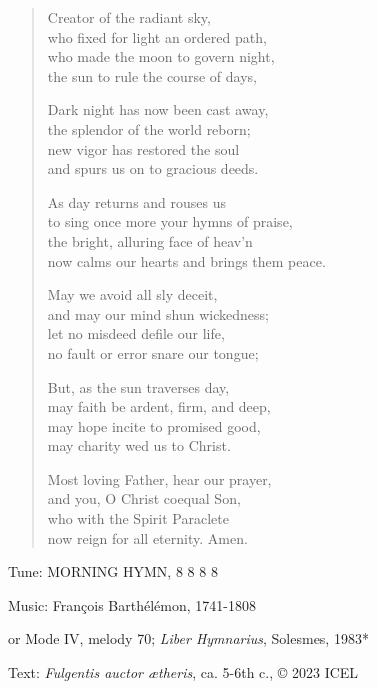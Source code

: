 \hymn

\begin{verse}
Creator of the radiant sky,\\
who fixed for light an ordered path,\\
who made the moon to govern night,\\
the sun to rule the course of days,

Dark night has now been cast away,\\
the splendor of the world reborn;\\
new vigor has restored the soul\\
and spurs us on to gracious deeds.

As day returns and rouses us\\
to sing once more your hymns of praise,\\
the bright, alluring face of heav’n\\
now calms our hearts and brings them peace.

May we avoid all sly deceit,\\
and may our mind shun wickedness;\\
let no misdeed defile our life,\\
no fault or error snare our tongue;

But, as the sun traverses day,\\
may faith be ardent, firm, and deep,\\
may hope incite to promised good,\\
may charity wed us to Christ.

Most loving Father, hear our prayer,\\
and you, O Christ coequal Son,\\
who with the Spirit Paraclete\\
now reign for all eternity. Amen.
\end{verse}

\begin{hymnsource}
Tune: MORNING HYMN, 8 8 8 8

Music: François Barthélémon, 1741-1808

or Mode IV, melody 70; \emph{Liber Hymnarius}, Solesmes, 1983*

Text: \emph{Fulgentis auctor ætheris}, ca. 5-6th c., © 2023 ICEL
\end{hymnsource}